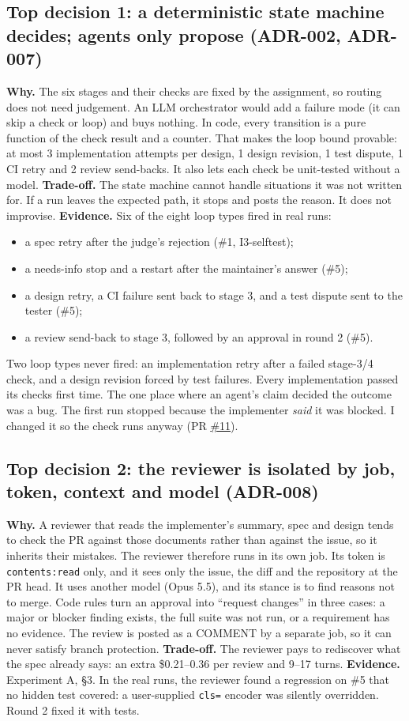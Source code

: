 \documentclass[11pt,a4paper]{article}
\newcommand{\gh}[1]{\href{https://github.com/iDheer/tinydb/#1}}
\begin{document}
\subsection*{Top decision 1: a deterministic state machine decides; agents only propose (ADR-002, ADR-007)}
\textbf{Why.} The six stages and their checks are fixed by the assignment, so routing does not need
judgement. An LLM orchestrator would add a failure mode (it can skip a check or loop) and buys
nothing. In code, every transition is a pure function of the check result and a counter. That makes
the loop bound provable: at most 3 implementation attempts per design, 1 design revision, 1 test
dispute, 1 CI retry and 2 review send-backs. It also lets each check be unit-tested without a model.
\textbf{Trade-off.} The state machine cannot handle situations it was not written for. If a run
leaves the expected path, it stops and posts the reason. It does not improvise.
\textbf{Evidence.} Six of the eight loop types fired in real runs:
\begin{itemize}
\item a spec retry after the judge's rejection (\#1, I3-selftest);
\item a needs-info stop and a restart after the maintainer's answer (\#5);
\item a design retry, a CI failure sent back to stage 3, and a test dispute sent to the tester (\#5);
\item a review send-back to stage 3, followed by an approval in round 2 (\#5).
\end{itemize}
Two loop types never fired: an implementation retry after a failed stage-3/4 check, and a design revision forced by test failures. Every implementation passed its checks first time. The one place where an agent's claim decided the outcome was a bug. The first run stopped because the
implementer \emph{said} it was blocked. I changed it so the check runs anyway (PR \gh{pull/11}{\#11}).

\subsection*{Top decision 2: the reviewer is isolated by job, token, context and model (ADR-008)}
\textbf{Why.} A reviewer that reads the implementer's summary, spec and design tends to check the PR
against those documents rather than against the issue, so it inherits their mistakes. The reviewer
therefore runs in its own job. Its token is \texttt{contents:read} only, and it sees only the issue,
the diff and the repository at the PR head. It uses another model (Opus 5.5), and its stance is to
find reasons not to merge. Code rules turn an approval into ``request changes'' in three cases: a
major or blocker finding exists, the full suite was not run, or a requirement has no evidence. The
review is posted as a COMMENT by a separate job, so it can never satisfy branch protection.
\textbf{Trade-off.} The reviewer pays to rediscover what the spec already says: an extra \$0.21--0.36
per review and 9--17 turns.
\textbf{Evidence.} Experiment A, §3. In the real runs, the reviewer found a regression on \#5 that
no hidden test covered: a user-supplied \texttt{cls=} encoder was silently overridden. Round 2
fixed it with tests.
\end{document}
